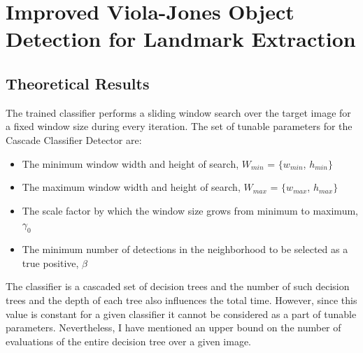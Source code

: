 \chapter{Improved Viola-Jones Object Detection for Landmark Extraction}
\label{appendix:one}

\section{Theoretical Results}

The trained classifier performs a  sliding window search over the target image for a fixed window size during every iteration. The set of tunable parameters for the Cascade Classifier Detector are:

\begin{itemize}
    \item The minimum window width and height of search, $W_{min}$ = $\{ w_{min}$, $h_{min} \}$
    \item The maximum window width and height of search, $W_{max}$ = $\{ w_{max}$, $h_{max} \}$
    \item The scale factor by which the window size grows from minimum to maximum, $\gamma_0$
    \item The minimum number of detections in the neighborhood to be selected as a true positive, $\beta$
\end{itemize}

The classifier is a cascaded set of decision trees and the number of such decision trees and the depth of each tree also influences the total time. However, since this value is constant for a given classifier it cannot be considered as a part of tunable parameters. Nevertheless, I have mentioned an upper bound on the number of evaluations of the entire decision tree over a given image.  \\

